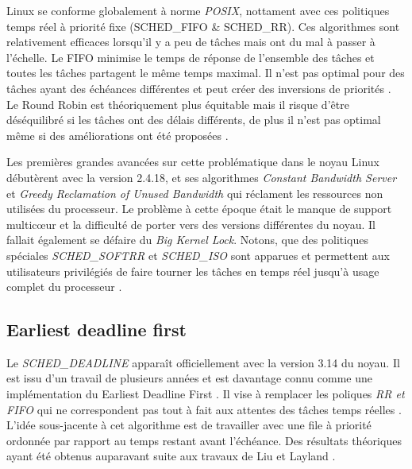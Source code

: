 \documentclass[letterpaper]{article}
\begin{document}
Linux se conforme globalement à norme \textit{POSIX}, nottament avec ces politiques temps réel à priorité fixe (SCHED\_FIFO \& SCHED\_RR). Ces algorithmes sont relativement efficaces lorsqu'il y a peu de tâches mais ont du mal à passer à l'échelle. Le FIFO minimise le temps de réponse de l'ensemble des tâches et toutes les tâches partagent le même temps maximal. Il n'est pas optimal pour des tâches ayant des échéances différentes et peut créer des inversions de priorités \citep{Klein:1993:PHR:174003}. Le Round Robin est théoriquement plus équitable mais il risque d'être déséquilibré si les tâches ont des délais différents, de plus il n'est pas optimal même si des améliorations ont été proposées \citep{Shreedhar:1995:EFQ:217391.217453}.

Les premières grandes avancées sur cette problématique dans le noyau Linux débutèrent avec la version 2.4.18, et ses algorithmes \textit{Constant Bandwidth Server} \citep{Abeni:1998:IMA:827270.829047} et \textit{Greedy Reclamation of Unused Bandwidth} \citep{Lipari:2000:GRU:1947412.1947445} qui réclament les ressources non utilisées du processeur. Le problème à cette époque était le manque de support multicœur et la difficulté de porter vers des versions différentes du noyau. Il fallait également se défaire du \textit{Big Kernel Lock}. Notons, que des politiques spéciales \textit{SCHED\_SOFTRR} et \textit{SCHED\_ISO} sont apparues et permettent aux utilisateurs privilégiés de faire tourner les tâches en temps réel jusqu'à usage complet du processeur \citep{scordino2006linux}.

\subsection{Earliest deadline first}

Le \textit{SCHED\_DEADLINE} apparaît officiellement avec la version 3.14 du noyau. Il est issu d'un travail de plusieurs années et est davantage connu comme une implémentation du Earliest Deadline First \citep{faggioli2009edf}. Il vise à remplacer les poliques \textit{RR et FIFO} qui ne correspondent pas tout à fait aux attentes des tâches temps réelles \citep{buttazzo2011hard}. L'idée sous-jacente à cet algorithme est de travailler avec une file à priorité ordonnée par rapport au temps restant avant l'échéance. Des résultats théoriques ayant été obtenus auparavant suite aux travaux de Liu et Layland \citep{liu1973scheduling}.

\newcommand{\pluseq}{\mathrel{+}=}
\end{document}
